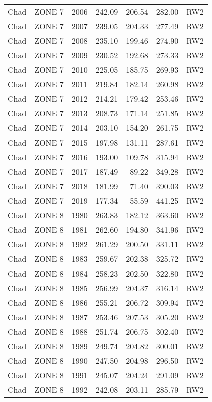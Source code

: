 \begin{longtable}{lllrrrl}
  Chad & ZONE 7 & 2006 & 242.09 & 206.54 & 282.00 & RW2 \\ 
  Chad & ZONE 7 & 2007 & 239.05 & 204.33 & 277.49 & RW2 \\ 
  Chad & ZONE 7 & 2008 & 235.10 & 199.46 & 274.90 & RW2 \\ 
  Chad & ZONE 7 & 2009 & 230.52 & 192.68 & 273.33 & RW2 \\ 
  Chad & ZONE 7 & 2010 & 225.05 & 185.75 & 269.93 & RW2 \\ 
  Chad & ZONE 7 & 2011 & 219.84 & 182.14 & 260.98 & RW2 \\ 
  Chad & ZONE 7 & 2012 & 214.21 & 179.42 & 253.46 & RW2 \\ 
  Chad & ZONE 7 & 2013 & 208.73 & 171.14 & 251.85 & RW2 \\ 
  Chad & ZONE 7 & 2014 & 203.10 & 154.20 & 261.75 & RW2 \\ 
  Chad & ZONE 7 & 2015 & 197.98 & 131.11 & 287.61 & RW2 \\ 
  Chad & ZONE 7 & 2016 & 193.00 & 109.78 & 315.94 & RW2 \\ 
  Chad & ZONE 7 & 2017 & 187.49 & 89.22 & 349.28 & RW2 \\ 
  Chad & ZONE 7 & 2018 & 181.99 & 71.40 & 390.03 & RW2 \\ 
  Chad & ZONE 7 & 2019 & 177.34 & 55.59 & 441.25 & RW2 \\ 
  Chad & ZONE 8 & 1980 & 263.83 & 182.12 & 363.60 & RW2 \\ 
  Chad & ZONE 8 & 1981 & 262.60 & 194.80 & 341.96 & RW2 \\ 
  Chad & ZONE 8 & 1982 & 261.29 & 200.50 & 331.11 & RW2 \\ 
  Chad & ZONE 8 & 1983 & 259.67 & 202.38 & 325.72 & RW2 \\ 
  Chad & ZONE 8 & 1984 & 258.23 & 202.50 & 322.80 & RW2 \\ 
  Chad & ZONE 8 & 1985 & 256.99 & 204.37 & 316.14 & RW2 \\ 
  Chad & ZONE 8 & 1986 & 255.21 & 206.72 & 309.94 & RW2 \\ 
  Chad & ZONE 8 & 1987 & 253.46 & 207.53 & 305.20 & RW2 \\ 
  Chad & ZONE 8 & 1988 & 251.74 & 206.75 & 302.40 & RW2 \\ 
  Chad & ZONE 8 & 1989 & 249.74 & 204.82 & 300.01 & RW2 \\ 
  Chad & ZONE 8 & 1990 & 247.50 & 204.98 & 296.50 & RW2 \\ 
  Chad & ZONE 8 & 1991 & 245.07 & 204.24 & 291.09 & RW2 \\ 
  Chad & ZONE 8 & 1992 & 242.08 & 203.11 & 285.79 & RW2 \\ 

\end{longtable}
